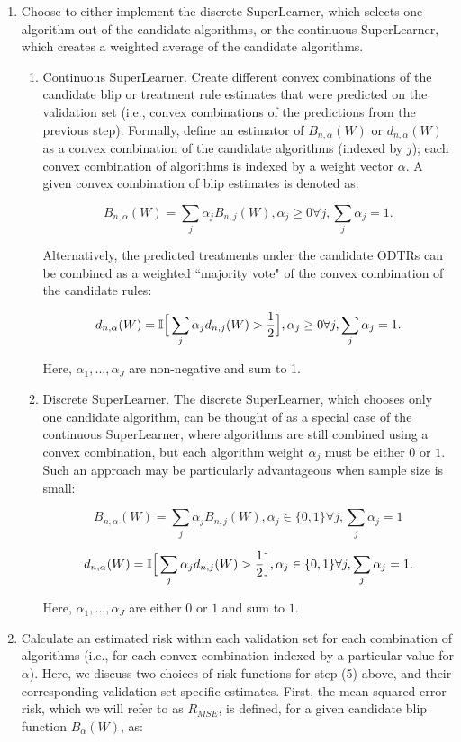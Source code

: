 \documentclass[a4paper,12pt]{article}
\begin{document}
\begin{enumerate}
\item Choose to either implement the discrete SuperLearner, which selects one algorithm out of the candidate algorithms, or the continuous SuperLearner, which creates a weighted average of the candidate algorithms. 
\begin{enumerate}
    \item Continuous SuperLearner. Create different convex combinations of the candidate blip or treatment rule estimates that were predicted on the validation set (i.e., convex combinations of the predictions from the previous step). Formally, define an estimator of $B_{n,\alpha}(W)$ or $d_{n,\alpha}(W)$ as a convex combination of the candidate algorithms (indexed by $j$); each convex combination of algorithms is indexed by a weight vector $\alpha$. A given convex combination of blip estimates is denoted as:
    
\[B_{n,\alpha}(W)=\sum_j \alpha_j B_{n,j}(W), \alpha_j \geq 0 \forall j, \sum_j \alpha_j = 1.\] 

Alternatively, the predicted treatments under the candidate ODTRs can be combined as a weighted ``majority vote" of the convex combination of the candidate rules:

\[d_{n,\alpha}(W) = \mathbb{I}\Big{[} \sum_j \alpha_j d_{n,j}(W) > \frac{1}{2}\Big{]}, \alpha_j \geq 0 \forall j, \sum_j \alpha_j = 1.\]

Here, $\alpha_1,...,\alpha_J$ are non-negative and sum to 1.

    \item Discrete SuperLearner. The discrete SuperLearner, which chooses only one candidate algorithm, can be thought of as a special case of the continuous SuperLearner, where algorithms are still combined using a convex combination, but each algorithm weight $\alpha_j$ must be either $0$ or $1$. Such an approach may be particularly advantageous when sample size is small:
    
    \[B_{n,\alpha}(W)=\sum_j \alpha_j B_{n,j}(W), \alpha_j \in \{0,1\} \forall j, \sum_j \alpha_j = 1\] 
    
    \[d_{n,\alpha}(W) = \mathbb{I}\Big{[} \sum_j \alpha_j d_{n,j}(W) > \frac{1}{2}\Big{]}, \alpha_j \in \{0,1\}  \forall j, \sum_j \alpha_j = 1.\]
    
    Here, $\alpha_1,...,\alpha_J$ are either $0$ or $1$ and sum to $1$.
    
\end{enumerate}
\item Calculate an estimated risk within each validation set for each combination of algorithms (i.e., for each convex combination indexed by a particular value for $\alpha$). Here, we discuss two choices of risk functions for step (5) above, and their corresponding validation set-specific estimates. First, the mean-squared error risk, which we will refer to as $R_{MSE}$, is defined, for a given candidate blip function $B_{\alpha}(W)$, as:


\end{enumerate}
\end{document}
